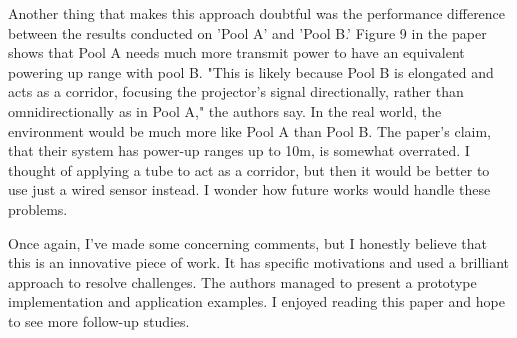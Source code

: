 \documentclass[10pt,a4paper]{article}
\begin{document}
	Another thing that makes this approach doubtful was the performance difference between the results conducted on 'Pool A' and 'Pool B.' Figure 9 in the paper shows that Pool A needs much more transmit power to have an equivalent powering up range with pool B. "This is likely because Pool B is elongated and acts as a corridor, focusing the projector's signal directionally, rather than omnidirectionally as in Pool A," the authors say. In the real world, the environment would be much more like Pool A than Pool B. The paper's claim, that their system has power-up ranges up to 10m, is somewhat overrated. I thought of applying a tube to act as a corridor, but then it would be better to use just a wired sensor instead. I wonder how future works would handle these problems.
	
	Once again, I've made some concerning comments, but I honestly believe that this is an innovative piece of work. It has specific motivations and used a brilliant approach to resolve challenges. The authors managed to present a prototype implementation and application examples. I enjoyed reading this paper and hope to see more follow-up studies.
	
\end{document}
